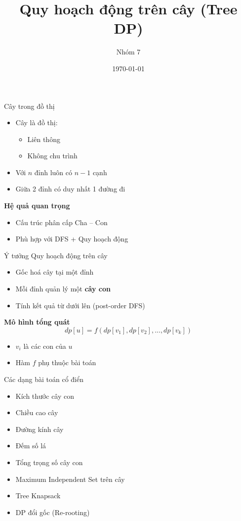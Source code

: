 \documentclass[aspectratio=169]{beamer}
\title{Quy hoạch động trên cây (Tree DP)}
\author{Nhóm 7}
\date{\today}
\begin{document}
\begin{frame}
\titlepage
\end{frame}

\begin{frame}{Cây trong đồ thị}
\begin{itemize}
    \item Cây là đồ thị:
    \begin{itemize}
        \item Liên thông
        \item Không chu trình
    \end{itemize}
    \item Với $n$ đỉnh luôn có $n-1$ cạnh
    \item Giữa 2 đỉnh có duy nhất 1 đường đi
\end{itemize}

\vspace{6pt}
\textbf{Hệ quả quan trọng}
\begin{itemize}
    \item Cấu trúc phân cấp Cha -- Con
    \item Phù hợp với DFS + Quy hoạch động
\end{itemize}
\end{frame}

\begin{frame}{Ý tưởng Quy hoạch động trên cây}
\begin{itemize}
    \item Gốc hoá cây tại một đỉnh
    \item Mỗi đỉnh quản lý một \textbf{cây con}
    \item Tính kết quả từ dưới lên (post-order DFS)
\end{itemize}

\vspace{6pt}
\textbf{Mô hình tổng quát}
\[
dp[u] = f(dp[v_1], dp[v_2], ..., dp[v_k])
\]

\begin{itemize}
    \item $v_i$ là các con của $u$
    \item Hàm $f$ phụ thuộc bài toán
\end{itemize}
\end{frame}

\begin{frame}{Các dạng bài toán cổ điển}
\begin{itemize}
    \item Kích thước cây con
    \item Chiều cao cây
    \item Đường kính cây
    \item Đếm số lá
    \item Tổng trọng số cây con
    \item Maximum Independent Set trên cây
    \item Tree Knapsack
    \item DP đổi gốc (Re-rooting)
\end{itemize}
\end{frame}
\end{document}
